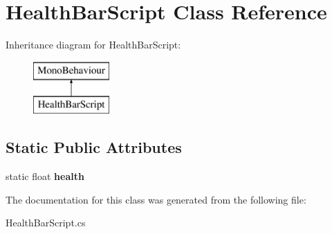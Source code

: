 \hypertarget{class_health_bar_script}{}\section{Health\+Bar\+Script Class Reference}
\label{class_health_bar_script}
Inheritance diagram for Health\+Bar\+Script\+:\begin{figure}[H]
\begin{center}
\leavevmode
\includegraphics[height=2.000000cm]{class_health_bar_script}
\end{center}
\end{figure}
\subsection*{Static Public Attributes}
\begin{DoxyCompactItemize}
\item 
\mbox{\label{class_health_bar_script_a3ee24ea7a76f5141550424cdb9021df5}} 
static float {\bfseries health}
\end{DoxyCompactItemize}


The documentation for this class was generated from the following file\+:\begin{DoxyCompactItemize}
\item 
Health\+Bar\+Script.\+cs\end{DoxyCompactItemize}
